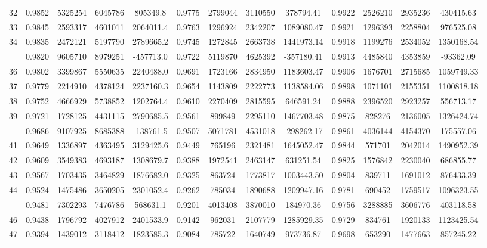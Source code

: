 \documentclass[
  12pt,
]{article}
\begin{document}
\begin{longtable}[t]{lcccccccccccc}
32 & 0.9852 & 5325254 & 6045786 & 805349.8 & 0.9775 & 2799044 & 3110550 & 378794.41 & 0.9922 & 2526210 & 2935236 & 430415.63\\
33 & 0.9845 & 2593317 & 4601011 & 2064011.4 & 0.9763 & 1296924 & 2342207 & 1089080.47 & 0.9921 & 1296393 & 2258804 & 976525.08\\
34 & 0.9835 & 2472121 & 5197790 & 2789665.2 & 0.9745 & 1272845 & 2663738 & 1441973.14 & 0.9918 & 1199276 & 2534052 & 1350168.54\\
\addlinespace
35 & 0.9820 & 9605710 & 8979251 & -457713.0 & 0.9722 & 5119870 & 4625392 & -357180.41 & 0.9913 & 4485840 & 4353859 & -93362.09\\
36 & 0.9802 & 3399867 & 5550635 & 2240488.0 & 0.9691 & 1723166 & 2834950 & 1183603.47 & 0.9906 & 1676701 & 2715685 & 1059749.33\\
37 & 0.9779 & 2214910 & 4378124 & 2237160.3 & 0.9654 & 1143809 & 2222773 & 1138584.06 & 0.9898 & 1071101 & 2155351 & 1100818.18\\
38 & 0.9752 & 4666929 & 5738852 & 1202764.4 & 0.9610 & 2270409 & 2815595 & 646591.24 & 0.9888 & 2396520 & 2923257 & 556713.17\\
39 & 0.9721 & 1728125 & 4431115 & 2790685.5 & 0.9561 & 899849 & 2295110 & 1467703.48 & 0.9875 & 828276 & 2136005 & 1326424.74\\
\addlinespace
40 & 0.9686 & 9107925 & 8685388 & -138761.5 & 0.9507 & 5071781 & 4531018 & -298262.17 & 0.9861 & 4036144 & 4154370 & 175557.06\\
41 & 0.9649 & 1336897 & 4363495 & 3129425.6 & 0.9449 & 765196 & 2321481 & 1645052.47 & 0.9844 & 571701 & 2042014 & 1490952.39\\
42 & 0.9609 & 3549383 & 4693187 & 1308679.7 & 0.9388 & 1972541 & 2463147 & 631251.54 & 0.9825 & 1576842 & 2230040 & 686855.77\\
43 & 0.9567 & 1703435 & 3464829 & 1876682.0 & 0.9325 & 863724 & 1773817 & 1003443.50 & 0.9804 & 839711 & 1691012 & 876433.39\\
44 & 0.9524 & 1475486 & 3650205 & 2301052.4 & 0.9262 & 785034 & 1890688 & 1209947.16 & 0.9781 & 690452 & 1759517 & 1096323.55\\
\addlinespace
45 & 0.9481 & 7302293 & 7476786 & 568631.1 & 0.9201 & 4013408 & 3870010 & 184970.36 & 0.9756 & 3288885 & 3606776 & 403118.58\\
46 & 0.9438 & 1796792 & 4027912 & 2401533.9 & 0.9142 & 962031 & 2107779 & 1285929.35 & 0.9729 & 834761 & 1920133 & 1123425.54\\
47 & 0.9394 & 1439012 & 3118412 & 1823585.3 & 0.9084 & 785722 & 1640749 & 973736.87 & 0.9698 & 653290 & 1477663 & 857245.22\\

\end{longtable}
\end{document}
